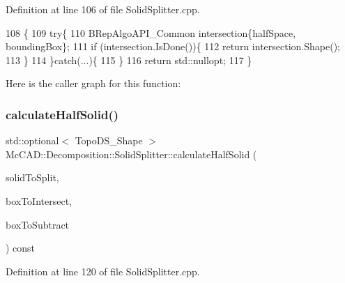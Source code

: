 Definition at line 106 of file Solid\+Splitter.\+cpp.


\begin{DoxyCode}
108                                               \{
109     \textcolor{keywordflow}{try}\{
110         BRepAlgoAPI\_Common intersection\{halfSpace, boundingBox\};
111         \textcolor{keywordflow}{if} (intersection.IsDone())\{
112             \textcolor{keywordflow}{return} intersection.Shape();
113         \}
114     \}\textcolor{keywordflow}{catch}(...)\{
115     \}
116     \textcolor{keywordflow}{return} std::nullopt;
117 \}
\end{DoxyCode}
Here is the caller graph for this function\+:
\mbox{\label{classMcCAD_1_1Decomposition_1_1SolidSplitter_aa2399efe97e9013c846b4c41907c9339}} 
\subsubsection{\texorpdfstring{calculate\+Half\+Solid()}{calculateHalfSolid()}\hspace{0.1cm}{\footnotesize\ttfamily [1/2]}}
{\footnotesize\ttfamily std\+::optional$<$ Topo\+D\+S\+\_\+\+Shape $>$ Mc\+C\+A\+D\+::\+Decomposition\+::\+Solid\+Splitter\+::calculate\+Half\+Solid (\begin{DoxyParamCaption}\item[{const Topo\+D\+S\+\_\+\+Solid \&}]{solid\+To\+Split,  }\item[{const Topo\+D\+S\+\_\+\+Shape \&}]{box\+To\+Intersect,  }\item[{const Topo\+D\+S\+\_\+\+Shape \&}]{box\+To\+Subtract }\end{DoxyParamCaption}) const\hspace{0.3cm}{\ttfamily [private]}}



Definition at line 120 of file Solid\+Splitter.\+cpp.


